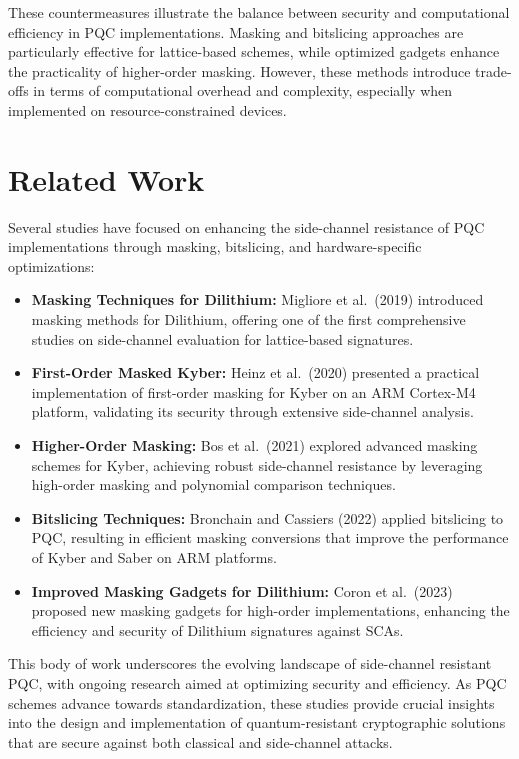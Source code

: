 These countermeasures illustrate the balance between security and computational efficiency in \ac{PQC} implementations. Masking and bitslicing approaches are particularly effective for lattice-based schemes, while optimized gadgets enhance the practicality of higher-order masking. However, these methods introduce trade-offs in terms of computational overhead and complexity, especially when implemented on resource-constrained devices.

\section{Related Work}

Several studies have focused on enhancing the side-channel resistance of \ac{PQC} implementations through masking, bitslicing, and hardware-specific optimizations:

\begin{itemize}
    \item \textbf{Masking Techniques for Dilithium:} Migliore et al.\ (2019) \cite{Migliore19} introduced masking methods for Dilithium, offering one of the first comprehensive studies on side-channel evaluation for lattice-based signatures.
    \item \textbf{First-Order Masked Kyber:} Heinz et al.\ (2020) \cite{Heinz20} presented a practical implementation of first-order masking for Kyber on an \ac{ARM} Cortex-M4 platform, validating its security through extensive side-channel analysis.
    \item \textbf{Higher-Order Masking:} Bos et al.\ (2021) \cite{Bos21} explored advanced masking schemes for Kyber, achieving robust side-channel resistance by leveraging high-order masking and polynomial comparison techniques.
    \item \textbf{Bitslicing Techniques:} Bronchain and Cassiers (2022) \cite{Bronchain22} applied bitslicing to \ac{PQC}, resulting in efficient masking conversions that improve the performance of Kyber and Saber on \ac{ARM} platforms.
    \item \textbf{Improved Masking Gadgets for Dilithium:} Coron et al.\ (2023) \cite{Coron23} proposed new masking gadgets for high-order implementations, enhancing the efficiency and security of Dilithium signatures against \acp{SCA}.
\end{itemize}

This body of work underscores the evolving landscape of side-channel resistant \ac{PQC}, with ongoing research aimed at optimizing security and efficiency. As \ac{PQC} schemes advance towards standardization, these studies provide crucial insights into the design and implementation of quantum-resistant cryptographic solutions that are secure against both classical and side-channel attacks.
